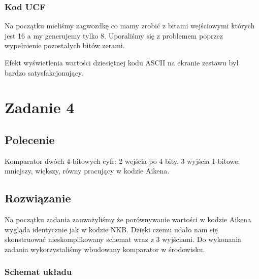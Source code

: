 \documentclass[a4paper,12pt]{extarticle}  %
\begin{document}
\subsubsection{Kod UCF}


Na początku mieliśmy zagwozdkę co mamy zrobić z bitami wejściowymi których jest 16 a my generujemy tylko 8. Uporaliśmy się z problemem poprzez wypełnienie pozostałych bitów zerami.

Efekt wyświetlenia wartości dziesiętnej kodu ASCII na ekranie zestawu był bardzo satysfakcjonujący.
\section{Zadanie 4}
\subsection{Polecenie}
Komparator dwóch 4-bitowych cyfr: 2 wejścia po 4 bity, 3 wyjścia 1-bitowe: 
mniejszy, większy, równy pracujący w kodzie Aikena.
\subsection{Rozwiązanie}
Na początku zadania zauważyliśmy że porównywanie wartości w kodzie Aikena wygląda identycznie jak w kodzie NKB.
Dzięki czemu udało nam się skonstruować nieskomplikowany schemat wraz z 3 wyjściami.
Do wykonania zadania wykorzystaliśmy wbudowany komparator w środowisku.
\subsubsection{Schemat układu}
\begin{figure}[H]
   \centering
\end{figure}
\end{document}
